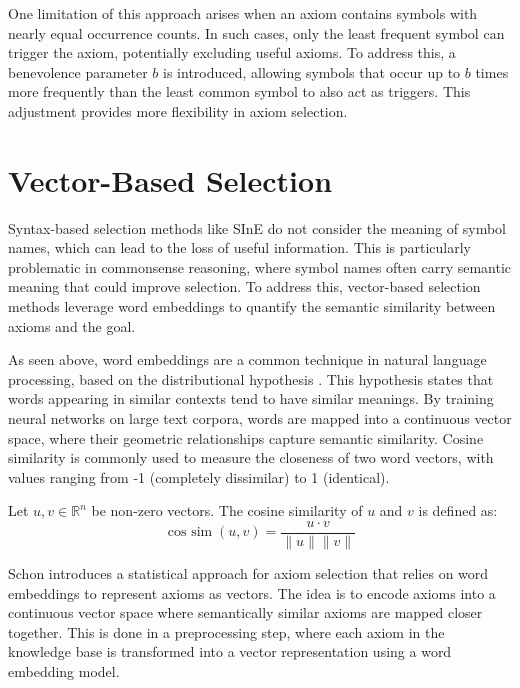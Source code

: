 \documentclass[english,version-2020-11]{uzl-thesis}
\begin{document}
One limitation of this approach arises when an axiom contains symbols with nearly equal occurrence counts. In such cases, only the least frequent symbol can trigger the axiom, potentially excluding useful axioms. To address this, a benevolence parameter \( b \) is introduced, allowing symbols that occur up to \( b \) times more frequently than the least common symbol to also act as triggers. This adjustment provides more flexibility in axiom selection.

\section{Vector-Based Selection}

Syntax-based selection methods like SInE do not consider the meaning of symbol names, which can lead to the loss of useful information. This is particularly problematic in commonsense reasoning, where symbol names often carry semantic meaning that could improve selection. To address this, vector-based selection methods leverage word embeddings to quantify the semantic similarity between axioms and the goal.

As seen above, word embeddings are a common technique in natural language processing, based on the distributional hypothesis \cite{Miller1991}. This hypothesis states that words appearing in similar contexts tend to have similar meanings. By training neural networks on large text corpora, words are mapped into a continuous vector space, where their geometric relationships capture semantic similarity. Cosine similarity is commonly used to measure the closeness of two word vectors, with values ranging from -1 (completely dissimilar) to 1 (identical).

\begin{definition}
    Let \( u, v \in \mathbb{R}^n \) be non-zero vectors. The cosine similarity of \( u \) and \( v \) is defined as:
    \begin{equation}
        \operatorname{cos\ sim}(u, v) = \frac{u \cdot v}{\|u\| \|v\|}
    \end{equation}
\end{definition}

Schon \cite{Schon2023} introduces a statistical approach for axiom selection that relies on word embeddings to represent axioms as vectors. The idea is to encode axioms into a continuous vector space where semantically similar axioms are mapped closer together. This is done in a preprocessing step, where each axiom in the knowledge base is transformed into a vector representation using a word embedding model.
\end{document}
